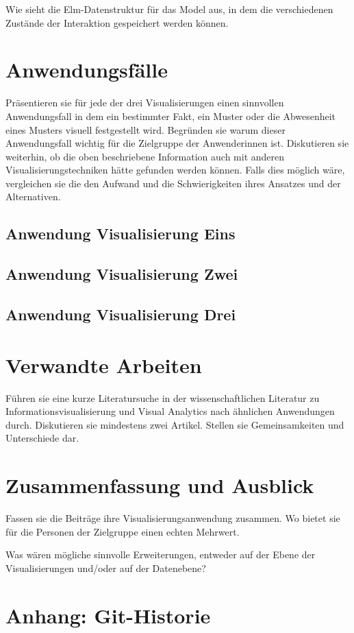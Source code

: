 \documentclass[usegeometry=true]{scrartcl}
\begin{document}
Wie sieht die Elm-Datenstruktur für das Model aus, in dem die verschiedenen Zustände der Interaktion gespeichert werden können.

\section{Anwendungsfälle}
Präsentieren sie für jede der drei Visualisierungen einen sinnvollen Anwendungsfall in dem ein bestimmter Fakt, ein Muster oder die Abwesenheit eines Musters visuell festgestellt wird. Begründen sie warum dieser Anwendungsfall wichtig für die Zielgruppe der Anwenderinnen ist. Diskutieren sie weiterhin, ob die oben beschriebene Information auch mit anderen Visualisierungstechniken hätte gefunden werden können. Falls dies möglich wäre, vergleichen sie die den Aufwand und die Schwierigkeiten ihres Ansatzes und der Alternativen. 
\subsection{Anwendung Visualisierung Eins}
\subsection{Anwendung Visualisierung Zwei}
\subsection{Anwendung Visualisierung Drei}

\section{Verwandte Arbeiten}
Führen sie eine kurze Literatursuche in der wissenschaftlichen Literatur zu Informationsvisualisierung und Visual Analytics nach ähnlichen Anwendungen durch. Diskutieren sie mindestens zwei Artikel. Stellen sie Gemeinsamkeiten und Unterschiede dar.

\section{Zusammenfassung und Ausblick}
Fassen sie die Beiträge ihre Visualisierungsanwendung zusammen. Wo bietet sie für die Personen der Zielgruppe einen echten Mehrwert.

Was wären mögliche sinnvolle Erweiterungen, entweder auf der Ebene der Visualisierungen und/oder auf der Datenebene?

\section*{Anhang: Git-Historie}

\printbibliography
\end{document}
